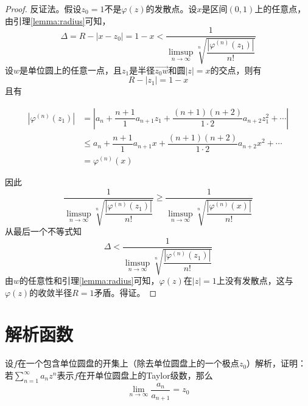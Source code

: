 \begin{proof}

    反证法。假设$z_0 = 1$不是$\varphi(z)$的发散点。设$x$是区间$(0,1)$上的任意点，由引理\ref{lemma:radius}可知，
    $$\Delta = R - |x - z_0| = 1 - x < \dfrac{1}{\limsup\limits_{n \to \infty}{\sqrt[n]{\dfrac{|\varphi^{(n)}(z_1)|}{n!}}}}$$
    设$w$是单位圆上的任意一点，且$z_1$是半径$\vec{z_0w}$和圆$|z| = x$的交点，则有
    $$R - |z_1| = 1 - x$$
    且有
    
    \begin{align*}
        |\varphi^{(n)}(z_1)| & = \left| a_n + \dfrac{n + 1}{1} a_{n + 1}z_1 + \dfrac{(n + 1)(n + 2)}{1 \cdot 2}a_{n + 2}z_1^2 + \cdots \right| \\
        & \leq a_n + \dfrac{n + 1}{1} a_{n + 1}x + \dfrac{(n + 1)(n + 2)}{1 \cdot 2}a_{n + 2}x^2 + \cdots \\
        & = \varphi^{(n)}(x)
    \end{align*}

    因此
    $$\dfrac{1}{\limsup\limits_{n \to \infty}{\sqrt[n]{\dfrac{|\varphi^{(n)}(z_1)|}{n!}}}} \geq \dfrac{1}{\limsup\limits_{n \to \infty}{\sqrt[n]{\dfrac{|\varphi^{(n)}(x)|}{n!}}}}$$
    从最后一个不等式知
    $$\Delta < \dfrac{1}{\limsup\limits_{n \to \infty}{\sqrt[n]{\dfrac{|\varphi^{(n)}(z_1)|}{n!}}}}$$
    由$w$的任意性和引理\ref{lemma:radius}可知，$\varphi(z)$在$|z| = 1$上没有发散点，这与$\varphi(z)$的收敛半径$R = 1$矛盾。得证。
    
\end{proof}

\section{解析函数}

\begin{proposition}
    
    设$f$在一个包含单位圆盘的开集上（除去单位圆盘上的一个极点$z_0$）解析，证明：
    若$\sum\limits_{n=1}^{\infty}{a_nz^n}$表示$f$在开单位圆盘上的\textup{Taylor}级数，那么
    $$\lim\limits_{n\to\infty}{\dfrac{a_n}{a_{n+1}}} = z_0$$

\end{proposition}

